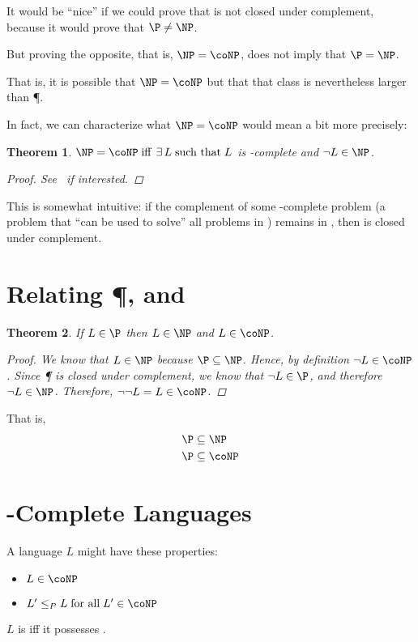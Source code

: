 \documentclass[a4paper]{report}
\newtheorem{theo}{Theorem}
\theoremstyle{definition}
\begin{document}
It would be ``nice'' if we could prove that \NP{} is not closed under complement, because it would prove that $\P \neq \NP$.

But proving the opposite, that is, $\NP = \coNP$, does not imply that $\P = \NP$.

That is, it is possible that $\NP = \coNP$ but that that class is nevertheless larger than \P{}.

In fact, we can characterize what $\NP = \coNP$ would mean a bit more precisely:
\begin{theo}
$\NP = \coNP \;\text{iff} \,\; \exists \, L \;\text{such that}\; L$ is \NP-complete and $\neg L \in \NP$.
\begin{proof}
See~\citep{rich2008automata} if interested.
\end{proof}
\end{theo}

This is somewhat intuitive: if the complement of some \NP-complete problem (a problem that ``can be used to solve'' all problems in \NP) remains in \NP{}, then \NP{} is closed under complement.

\section{Relating \P, \NP{} and \coNP}
\begin{theo}
If $L \in \P$ then $L \in \NP$ and $L \in \coNP$.
\begin{proof}
We know that $L \in \NP$ because $\P \subseteq \NP$. Hence, by definition $\neg L \in \coNP$. Since \P{} is closed under complement, we know that $\neg L \in \P$, and therefore $\neg L \in \NP$. Therefore, $\neg\neg L = L \in \coNP$.
\end{proof}
\end{theo}

That is,
\begin{align*}
\P & \subseteq \NP\\
\P & \subseteq \coNP
\end{align*}

\section{\coNP-Complete Languages}
A language $L$ might have these properties:
%
\begin{itemize}
\item {} $L \in \coNP$
\item {} $L' \leq_{P} L \; \text{for all} \;L' \in \coNP$
\end{itemize}
%
$L$ is  iff it possesses .
\end{document}
